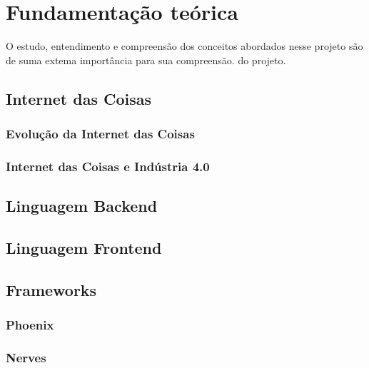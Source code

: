 \documentclass[../../layout.tex]{subfiles}
\begin{document}
\chapter{Fundamentação teórica}
\hspace*{3em}O estudo, entendimento e compreensão dos conceitos abordados nesse projeto são de suma extema importância para sua compreensão.
do projeto.

\section{Internet das Coisas}
\hspace*{3em}\blindtext[1]
\subsection{Evolução da Internet das Coisas}
\hspace*{3em}\blindtext[1]
\subsection{Internet das Coisas e Indústria 4.0}
\hspace*{3em}\blindtext[1]

\section{Linguagem Backend}
\hspace*{3em}\blindtext[1]

\section{Linguagem Frontend}
\hspace*{3em}\blindtext[1]

\section{Frameworks}
\hspace*{3em}\blindtext[1]
\subsection{Phoenix}
\hspace*{3em}\blindtext[1]
\subsection{Nerves}
\hspace*{3em}\blindtext[1]
\end{document}
